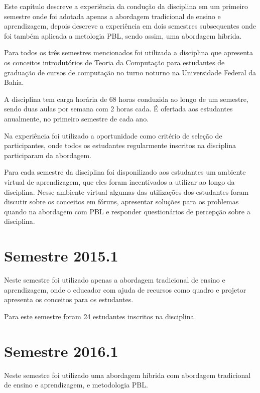 \acresetall

Este capítulo descreve a experiência da condução da disciplina em um primeiro
semestre onde foi adotada apenas a abordagem tradicional de ensino e aprendizagem,
depois descreve a experiência em dois semestres subsequentes onde foi também aplicada a metologia PBL,
sendo assim, uma abordagem híbrida.

Para todos os três semestres mencionados foi utilizada a disciplina que apresenta os
conceitos introdutórios de Teoria da Computação para estudantes de graduação de cursos de computação
no turno noturno na Universidade Federal da Bahia.

A disciplina tem carga horária de 68 horas conduzida ao longo de um semestre, sendo duas
aulas por semana com 2 horas cada.
É ofertada aos estudantes anualmente, no primeiro semestre de cada ano.

Na experiência foi utilizado a oportunidade como critério de seleção de participantes, onde todos os
estudantes regularmente inscritos na disciplina participaram da abordagem.

Para cada semestre da disciplina foi disponilizado aos estudantes um ambiente virtual de aprendizagem,
que eles foram incentivados a utilizar ao longo da disciplina.
Nesse ambiente virtual algumas das utilizações dos estudantes foram discutir sobre os conceitos
em fóruns, apresentar soluções para os problemas quando na abordagem com PBL e responder
questionários de percepção sobre a disciplina.

\section{Semestre 2015.1}
Neste semestre foi utilizado apenas a abordagem tradicional de ensino e aprendizagem, onde o educador
com ajuda de recursos como quadro e projetor apresenta os conceitos para os estudantes.

Para este semestre foram 24 estudantes inscritos na disciplina.


\section{Semestre 2016.1}

Neste semestre foi utilizado uma abordagem híbrida com abordagem tradicional de ensino
e aprendizagem, e metodologia PBL.

